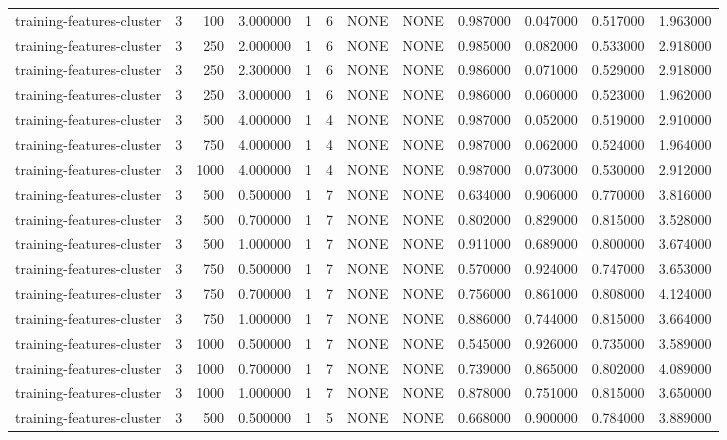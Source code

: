 \begin{tabular}{lrrrllllrrrr}
training-features-cluster & 3 & 100 & 3.000000 & 1 & 6 & NONE & NONE & 0.987000 & 0.047000 & 0.517000 & 1.963000 \\
training-features-cluster & 3 & 250 & 2.000000 & 1 & 6 & NONE & NONE & 0.985000 & 0.082000 & 0.533000 & 2.918000 \\
training-features-cluster & 3 & 250 & 2.300000 & 1 & 6 & NONE & NONE & 0.986000 & 0.071000 & 0.529000 & 2.918000 \\
training-features-cluster & 3 & 250 & 3.000000 & 1 & 6 & NONE & NONE & 0.986000 & 0.060000 & 0.523000 & 1.962000 \\
training-features-cluster & 3 & 500 & 4.000000 & 1 & 4 & NONE & NONE & 0.987000 & 0.052000 & 0.519000 & 2.910000 \\
training-features-cluster & 3 & 750 & 4.000000 & 1 & 4 & NONE & NONE & 0.987000 & 0.062000 & 0.524000 & 1.964000 \\
training-features-cluster & 3 & 1000 & 4.000000 & 1 & 4 & NONE & NONE & 0.987000 & 0.073000 & 0.530000 & 2.912000 \\
training-features-cluster & 3 & 500 & 0.500000 & 1 & 7 & NONE & NONE & 0.634000 & 0.906000 & 0.770000 & 3.816000 \\
training-features-cluster & 3 & 500 & 0.700000 & 1 & 7 & NONE & NONE & 0.802000 & 0.829000 & 0.815000 & 3.528000 \\
training-features-cluster & 3 & 500 & 1.000000 & 1 & 7 & NONE & NONE & 0.911000 & 0.689000 & 0.800000 & 3.674000 \\
training-features-cluster & 3 & 750 & 0.500000 & 1 & 7 & NONE & NONE & 0.570000 & 0.924000 & 0.747000 & 3.653000 \\
training-features-cluster & 3 & 750 & 0.700000 & 1 & 7 & NONE & NONE & 0.756000 & 0.861000 & 0.808000 & 4.124000 \\
training-features-cluster & 3 & 750 & 1.000000 & 1 & 7 & NONE & NONE & 0.886000 & 0.744000 & 0.815000 & 3.664000 \\
training-features-cluster & 3 & 1000 & 0.500000 & 1 & 7 & NONE & NONE & 0.545000 & 0.926000 & 0.735000 & 3.589000 \\
training-features-cluster & 3 & 1000 & 0.700000 & 1 & 7 & NONE & NONE & 0.739000 & 0.865000 & 0.802000 & 4.089000 \\
training-features-cluster & 3 & 1000 & 1.000000 & 1 & 7 & NONE & NONE & 0.878000 & 0.751000 & 0.815000 & 3.650000 \\
training-features-cluster & 3 & 500 & 0.500000 & 1 & 5 & NONE & NONE & 0.668000 & 0.900000 & 0.784000 & 3.889000 \\

\end{tabular}
